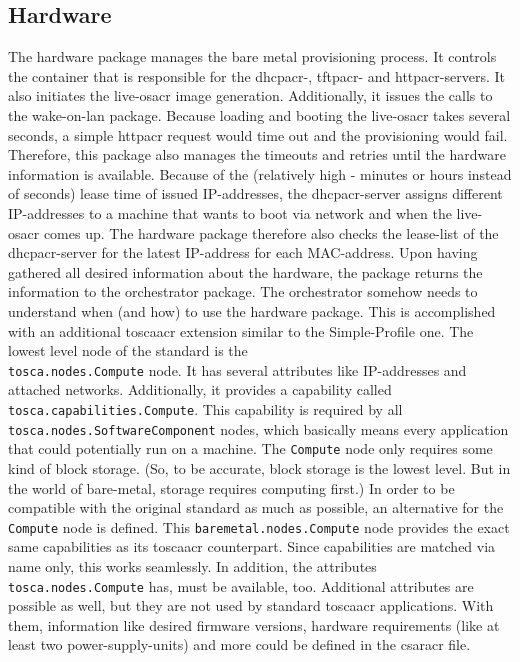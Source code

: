 \subsection{Hardware}
The hardware package manages the bare metal provisioning process. It controls the container that is responsible for the \gls{dhcpacr}-, \gls{tftpacr}- and \gls{httpacr}-servers. It also initiates the live-\gls{osacr} image generation. Additionally, it issues the calls to the wake-on-lan package. Because loading and booting the live-\gls{osacr} takes several seconds, a simple \gls{httpacr} request would time out and the provisioning would fail. Therefore, this package also manages the timeouts and retries until the hardware information is available. Because of the (relatively high - minutes or hours instead of seconds) lease time of issued IP-addresses, the \gls{dhcpacr}-server assigns different IP-addresses to a machine that wants to boot via network and when the live-\gls{osacr} comes up. The hardware package therefore also checks the lease-list of the \gls{dhcpacr}-server for the latest IP-address for each MAC-address.
\newline
Upon having gathered all desired information about the hardware, the package returns the information to the orchestrator package.
\newline
The orchestrator somehow needs to understand when (and how) to use the hardware package. This is accomplished with an additional \gls{toscaacr} extension similar to the Simple-Profile one. The lowest level node of the standard is the \\
\texttt{tosca.nodes.Compute} node. It has several attributes like IP-addresses and attached networks. Additionally, it provides a capability called \texttt{tosca.capabilities.Compute}. This capability is required by all \texttt{tosca.nodes.SoftwareComponent} nodes, which basically means every application that could potentially run on a machine. The \texttt{Compute} node only requires some kind of block storage. (So, to be accurate, block storage is the lowest level. But in the world of bare-metal, storage requires computing first.)
\newline
In order to be compatible with the original standard as much as possible, an alternative for the \texttt{Compute} node is defined. This \texttt{baremetal.nodes.Compute} node provides the exact same capabilities as its \gls{toscaacr} counterpart. Since capabilities are matched via name only, this works seamlessly. In addition, the attributes \texttt{tosca.nodes.Compute} has, must be available, too. Additional attributes are possible as well, but they are not used by standard \gls{toscaacr} applications. With them, information like desired firmware versions, hardware requirements (like at least two power-supply-units) and more could be defined in the \gls{csaracr} file. 
